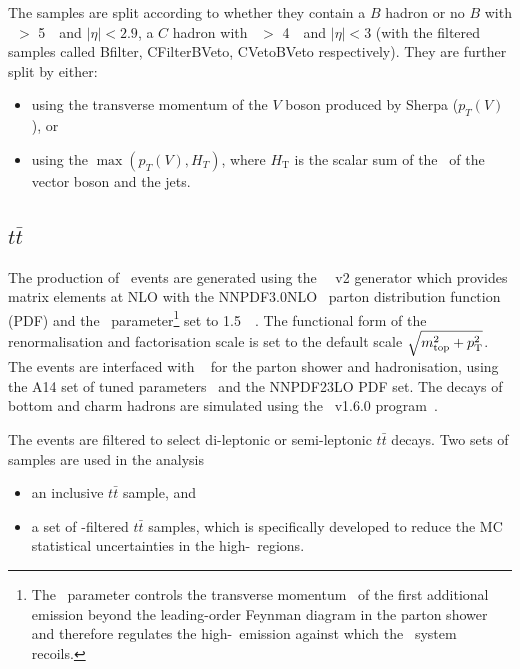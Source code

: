 \par The samples are split according to whether they contain a $B$ hadron or no $B$ with \pt~$>$ 5~\GeV~and $|\eta| < 2.9$, 
a $C$ hadron with \pt~$>$ 4~\GeV~and $|\eta| < 3$ (with the filtered samples called Bfilter, CFilterBVeto, CVetoBVeto respectively). 
They are further split by either:

\begin{itemize}
	\item using the transverse momentum of the $V$ boson produced by Sherpa ($p_T(V)$), or
	\item using the $\max(p_T(V), H_T)$, where $\ensuremath{H_{\mathrm{T}}}$ is the scalar sum of the \pt~of the vector boson and the jets.
\end{itemize}%

\subsection{$t\bar{t}$}

\par The production of \ttbar~events are generated using the \powhegbox~\cite{Frixione:2007nw,Nason:2004rx,Frixione:2007vw,Alioli:2010xd}~v2
generator which provides matrix elements at NLO with the NNPDF3.0NLO~\cite{Ball:2014uwa} parton distribution function (PDF) and the \hdamp\ parameter\footnote{The \hdamp\ parameter
controls the transverse momentum \pt\ of the first additional emission beyond the leading-order Feynman diagram
in the parton shower and therefore regulates the  high-\pt\ emission against which the \ttbar\ system recoils.} set to 1.5~\mtop~\cite{ATL-PHYS-PUB-2016-020}.
The functional form of the renormalisation and factorisation scale is set to the default scale $\sqrt{m_{\textrm{top}}^2 + p_{\textrm T}^2}$.
The events are interfaced with \pythia~\cite{Sjostrand:2014zea} for the parton shower and hadronisation,
using the A14 set of tuned parameters~\cite{ATL-PHYS-PUB-2014-021}  and the NNPDF23LO PDF set.
The decays of bottom and charm hadrons are simulated using the \evtgen\ v1.6.0 program~\cite{EvtGen}.

\par The events are filtered to select di-leptonic or semi-leptonic $t\bar{t}$ decays. Two sets of samples are used in the analysis

\begin{itemize}
	\item an inclusive $t\bar{t}$ sample, and
	\item a set of \met-filtered $t\bar{t}$ samples, which is specifically developed to reduce the MC statistical uncertainties in the high-\met~regions.
\end{itemize}

